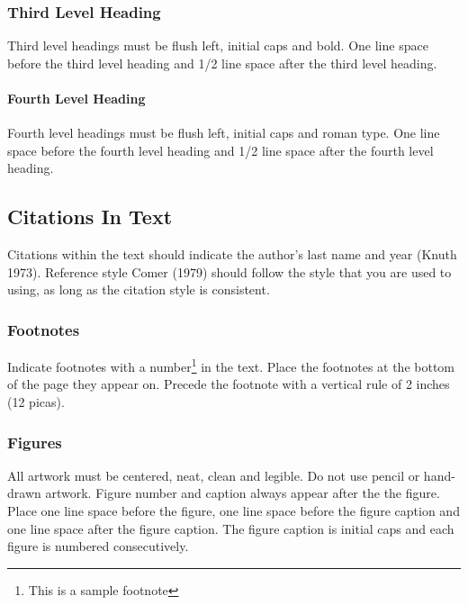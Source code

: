 \documentclass[a4paper]{article}
\begin{document}
\hypertarget{third-level-heading}{%
\subsubsection{Third Level Heading}\label{third-level-heading}}

Third level headings must be flush left, initial caps and bold. One line
space before the third level heading and 1/2 line space after the third
level heading.

\hypertarget{fourth-level-heading}{%
\paragraph{Fourth Level Heading}\label{fourth-level-heading}}

Fourth level headings must be flush left, initial caps and roman type.
One line space before the fourth level heading and 1/2 line space after
the fourth level heading.

\hypertarget{citations-in-text}{%
\subsection{Citations In Text}\label{citations-in-text}}

Citations within the text should indicate the author's last name and
year (Knuth 1973). Reference style Comer (1979) should follow the style
that you are used to using, as long as the citation style is consistent.

\hypertarget{footnotes}{%
\subsubsection{Footnotes}\label{footnotes}}

Indicate footnotes with a number\footnote{This is a sample footnote} in
the text. Place the footnotes at the bottom of the page they appear on.
Precede the footnote with a vertical rule of 2 inches (12 picas).

\hypertarget{figures}{%
\subsubsection{Figures}\label{figures}}

All artwork must be centered, neat, clean and legible. Do not use pencil
or hand-drawn artwork. Figure number and caption always appear after the
the figure. Place one line space before the figure, one line space
before the figure caption and one line space after the figure caption.
The figure caption is initial caps and each figure is numbered
consecutively.
\end{document}
